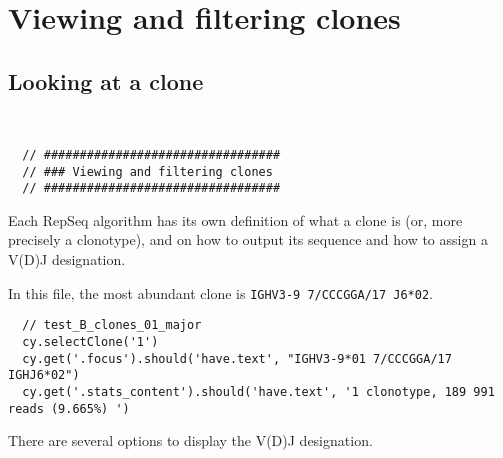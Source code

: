 \section{Viewing and filtering clones}


\subsection{Looking at a clone}
\begin{verbatim}


  // #################################
  // ### Viewing and filtering clones
  // #################################

\end{verbatim}

Each RepSeq algorithm has its own definition of what a clone is (or, more precisely
a clonotype), and on how to output its sequence and how to assign a V(D)J designation.

In this file, the most abundant clone
is \texttt{IGHV3-9 7/CCCGGA/17 J6*02}.



\begin{verbatim}
  // test_B_clones_01_major
  cy.selectClone('1')
  cy.get('.focus').should('have.text', "IGHV3-9*01 7/CCCGGA/17 IGHJ6*02")
  cy.get('.stats_content').should('have.text', '1 clonotype, 189 991 reads (9.665%) ')

\end{verbatim}


There are several options to display the V(D)J designation.


